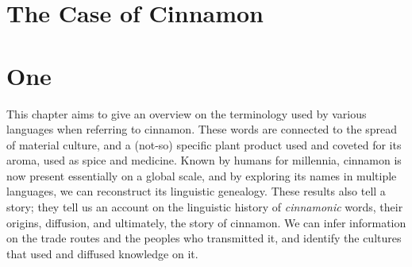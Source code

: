 



\section{The Case of Cinnamon}
\label{ch:cinnamon}

\section{One}


This chapter aims to give an overview on the terminology used by various languages when referring to cinnamon. These words are connected to the spread of material culture, and a (not-so) specific plant product used and coveted for its aroma, used as spice and medicine. Known by humans for millennia, cinnamon is now present essentially on a global scale, and by exploring its names in multiple languages, we can reconstruct its linguistic genealogy. These results also tell a story; they tell us an account on the linguistic history of \emph{cinnamonic} words, their origins, diffusion, and ultimately, the story of cinnamon. We can infer information on the trade routes and the peoples who transmitted it, and identify the cultures that used and diffused knowledge on it. 


